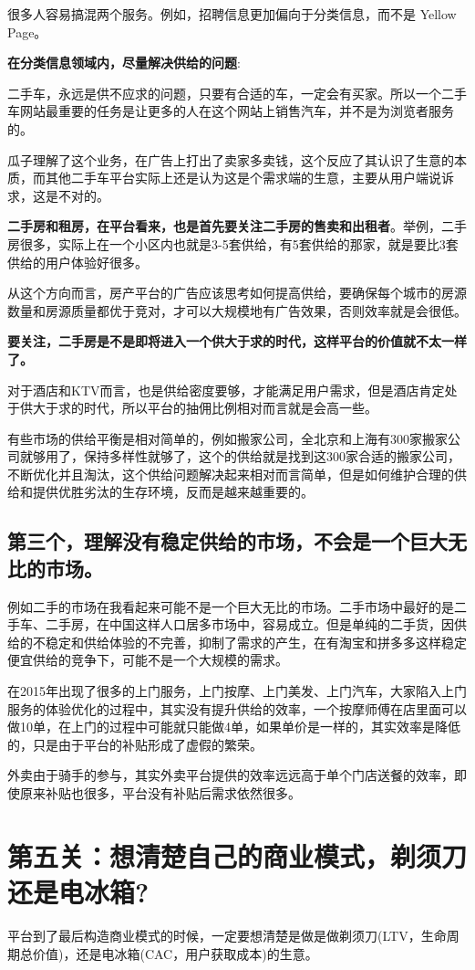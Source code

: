 \documentclass[12pt]{article}
\begin{document}
很多人容易搞混两个服务。例如，招聘信息更加偏向于分类信息，而不是 Yellow Page。

\textbf{在分类信息领域内，尽量解决供给的问题}:

二手车，永远是供不应求的问题，只要有合适的车，一定会有买家。所以一个二手车网站最重要的任务是让更多的人在这个网站上销售汽车，并不是为浏览者服务的。

瓜子理解了这个业务，在广告上打出了卖家多卖钱，这个反应了其认识了生意的本质，而其他二手车平台实际上还是认为这是个需求端的生意，主要从用户端说诉求，这是不对的。

\textbf{二手房和租房，在平台看来，也是首先要关注二手房的售卖和出租者}。举例，二手房很多，实际上在一个小区内也就是3-5套供给，有5套供给的那家，就是要比3套供给的用户体验好很多。

从这个方向而言，房产平台的广告应该思考如何提高供给，要确保每个城市的房源数量和房源质量都优于竞对，才可以大规模地有广告效果，否则效率就是会很低。

\textbf{要关注，二手房是不是即将进入一个供大于求的时代，这样平台的价值就不太一样了。}

对于酒店和KTV而言，也是供给密度要够，才能满足用户需求，但是酒店肯定处于供大于求的时代，所以平台的抽佣比例相对而言就是会高一些。

有些市场的供给平衡是相对简单的，例如搬家公司，全北京和上海有300家搬家公司就够用了，保持多样性就够了，这个的供给就是找到这300家合适的搬家公司，不断优化并且淘汰，这个供给问题解决起来相对而言简单，但是如何维护合理的供给和提供优胜劣汰的生存环境，反而是越来越重要的。


\subsection{第三个，理解没有稳定供给的市场，不会是一个巨大无比的市场。}
例如二手的市场在我看起来可能不是一个巨大无比的市场。二手市场中最好的是二手车、二手房，在中国这样人口居多市场中，容易成立。但是单纯的二手货，因供给的不稳定和供给体验的不完善，抑制了需求的产生，在有淘宝和拼多多这样稳定便宜供给的竞争下，可能不是一个大规模的需求。

在2015年出现了很多的上门服务，上门按摩、上门美发、上门汽车，大家陷入上门服务的体验优化的过程中，其实没有提升供给的效率，一个按摩师傅在店里面可以做10单，在上门的过程中可能就只能做4单，如果单价是一样的，其实效率是降低的，只是由于平台的补贴形成了虚假的繁荣。

外卖由于骑手的参与，其实外卖平台提供的效率远远高于单个门店送餐的效率，即使原来补贴也很多，平台没有补贴后需求依然很多。

\section{第五关：想清楚自己的商业模式，剃须刀还是电冰箱?}
平台到了最后构造商业模式的时候，一定要想清楚是做是做剃须刀(LTV，生命周期总价值)，还是电冰箱(CAC，用户获取成本)的生意。
\end{document}
